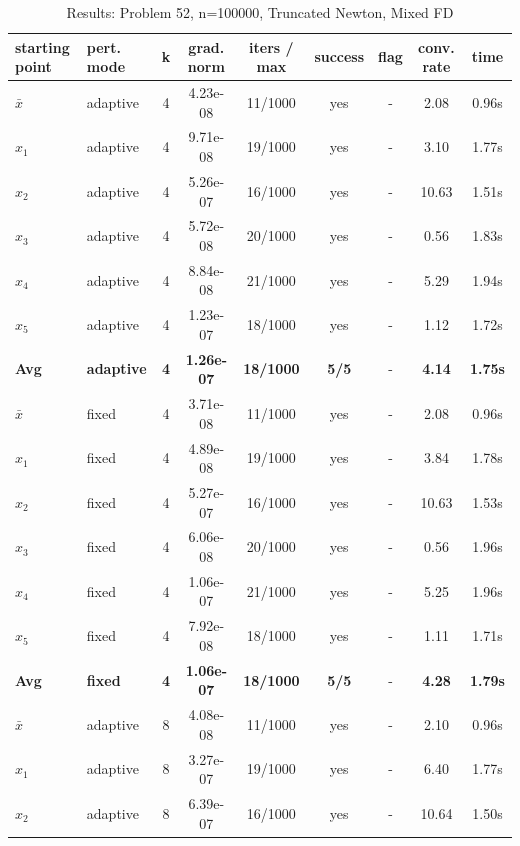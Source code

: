 \begin{longtable}{|l|l|c|c|c|c|c|c|c|}
\caption{Results: Problem 52, n=100000, Truncated Newton, Mixed FD} \\
\hline
\textbf{starting point} & \textbf{pert. mode} & \textbf{k} & \textbf{grad. norm} & \textbf{iters / max} & \textbf{success} & \textbf{flag} & \textbf{conv. rate} & \textbf{time} \\
\hline
\endfirsthead
\endhead
\endfoot
\hline
\endlastfoot
$\bar{x}$ & adaptive & 4 & 4.23e-08 & 11/1000 & yes & - & 2.08 & 0.96s \\
\hline
$x_1$ & adaptive & 4 & 9.71e-08 & 19/1000 & yes & - & 3.10 & 1.77s \\
\hline
$x_2$ & adaptive & 4 & 5.26e-07 & 16/1000 & yes & - & 10.63 & 1.51s \\
\hline
$x_3$ & adaptive & 4 & 5.72e-08 & 20/1000 & yes & - & 0.56 & 1.83s \\
\hline
$x_4$ & adaptive & 4 & 8.84e-08 & 21/1000 & yes & - & 5.29 & 1.94s \\
\hline
$x_5$ & adaptive & 4 & 1.23e-07 & 18/1000 & yes & - & 1.12 & 1.72s \\
\hline
\hline\hline
\textbf{Avg} & \textbf{adaptive} & \textbf{4} & \textbf{1.26e-07} & \textbf{18/1000} & \textbf{5/5} & - & \textbf{4.14} & \textbf{1.75s} \\
\hline\hline
\hline
$\bar{x}$ & fixed & 4 & 3.71e-08 & 11/1000 & yes & - & 2.08 & 0.96s \\
\hline
$x_1$ & fixed & 4 & 4.89e-08 & 19/1000 & yes & - & 3.84 & 1.78s \\
\hline
$x_2$ & fixed & 4 & 5.27e-07 & 16/1000 & yes & - & 10.63 & 1.53s \\
\hline
$x_3$ & fixed & 4 & 6.06e-08 & 20/1000 & yes & - & 0.56 & 1.96s \\
\hline
$x_4$ & fixed & 4 & 1.06e-07 & 21/1000 & yes & - & 5.25 & 1.96s \\
\hline
$x_5$ & fixed & 4 & 7.92e-08 & 18/1000 & yes & - & 1.11 & 1.71s \\
\hline
\hline\hline
\textbf{Avg} & \textbf{fixed} & \textbf{4} & \textbf{1.06e-07} & \textbf{18/1000} & \textbf{5/5} & - & \textbf{4.28} & \textbf{1.79s} \\
\hline\hline
$\bar{x}$ & adaptive & 8 & 4.08e-08 & 11/1000 & yes & - & 2.10 & 0.96s \\
\hline
$x_1$ & adaptive & 8 & 3.27e-07 & 19/1000 & yes & - & 6.40 & 1.77s \\
\hline
$x_2$ & adaptive & 8 & 6.39e-07 & 16/1000 & yes & - & 10.64 & 1.50s \\

\end{longtable}
